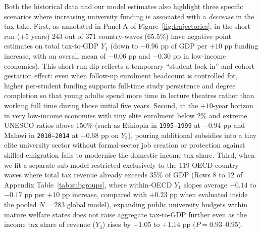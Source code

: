 \documentclass[11pt,a4paper]{article}
\begin{document}
Both the historical data and our model estimates also highlight three specific scenarios where increasing university funding is associated with a \emph{decrease} in the tax take. First, as annotated in Panel A of Figure~\ref{fig:trajectories}, in the short run ($+5$ years) 243 out of 371 country-waves ($65.5\%$) have negative point estimates on total tax-to-GDP $Y_1$ (down to $-0.96$ pp of GDP per $+10$ pp funding increase, with an overall mean of $-0.06$ pp and $-0.30$ pp in low-income economies). This short-run dip reflects a temporary ``student lock-in'' and cohort-gestation effect: even when follow-up enrolment headcount is controlled for, higher per-student funding supports full-time study persistence and degree completion so that young adults spend more time in lecture theatres rather than working full time during those initial five years. Second, at the $+10$-year horizon in very low-income economies with tiny elite enrolment below 2\% and extreme UNESCO ratios above 150\% (such as Ethiopia in \texttt{1995--1999} at $-0.94$ pp and Malawi in \texttt{2010--2014} at $-0.68$ pp on $Y_3$), pouring additional subsidies into a tiny elite university sector without formal-sector job creation or protection against skilled emigration \citep{beine2008brain} fails to modernise the domestic income tax share. Third, when we fit a separate sub-model restricted exclusively to the 119 OECD country-waves where total tax revenue already exceeds 35\% of GDP (Rows 8 to 12 of Appendix Table~\ref{tab:subgroups}, where within-OECD $Y_1$ slopes average $-0.14$ to $-0.17$ pp per $+10$ pp increase, compared with $+0.23$ pp when evaluated inside the pooled $N = 283$ global model), expanding public university budgets within mature welfare states does not raise aggregate tax-to-GDP further even as the income tax share of revenue ($Y_3$) rises by $+1.05$ to $+1.14$ pp ($P = 0.93\text{--}0.95$).
\end{document}

